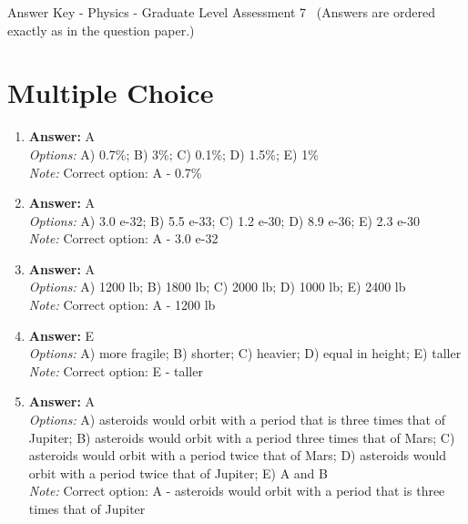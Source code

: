 \documentclass[12pt]{article}
\begin{document}
\begin{center}
Answer Key - Physics - Graduate Level Assessment 7 \
\small (Answers are ordered exactly as in the question paper.)
\end{center}

\section*{Multiple Choice}
\begin{enumerate}[label=\arabic*.]
\item \textbf{Answer:} A
\\ \textit{Options:} A) 0.7\%; B) 3\%; C) 0.1\%; D) 1.5\%; E) 1\%
\\ \textit{Note:} Correct option: A - 0.7\%
\item \textbf{Answer:} A
\\ \textit{Options:} A) 3.0 e-32; B) 5.5 e-33; C) 1.2 e-30; D) 8.9 e-36; E) 2.3 e-30
\\ \textit{Note:} Correct option: A - 3.0 e-32
\item \textbf{Answer:} A
\\ \textit{Options:} A) 1200 lb; B) 1800 lb; C) 2000 lb; D) 1000 lb; E) 2400 lb
\\ \textit{Note:} Correct option: A - 1200 lb
\item \textbf{Answer:} E
\\ \textit{Options:} A) more fragile; B) shorter; C) heavier; D) equal in height; E) taller
\\ \textit{Note:} Correct option: E - taller
\item \textbf{Answer:} A
\\ \textit{Options:} A) asteroids would orbit with a period that is three times that of Jupiter; B) asteroids would orbit with a period three times that of Mars; C) asteroids would orbit with a period twice that of Mars; D) asteroids would orbit with a period twice that of Jupiter; E) A and B
\\ \textit{Note:} Correct option: A - asteroids would orbit with a period that is three times that of Jupiter
\end{enumerate}
\end{document}
